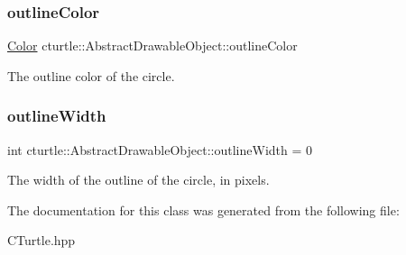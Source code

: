 \subsubsection{\texorpdfstring{outline\+Color}{outlineColor}}
{\footnotesize\ttfamily \hyperlink{classcturtle_1_1Color}{Color} cturtle\+::\+Abstract\+Drawable\+Object\+::outline\+Color}

The outline color of the circle. \mbox{\label{classcturtle_1_1AbstractDrawableObject_aeffaecc245057e9a42e5688671a77f52}} 
\subsubsection{\texorpdfstring{outline\+Width}{outlineWidth}}
{\footnotesize\ttfamily int cturtle\+::\+Abstract\+Drawable\+Object\+::outline\+Width = 0}

The width of the outline of the circle, in pixels. 

The documentation for this class was generated from the following file\+:\begin{DoxyCompactItemize}
\item 
C\+Turtle.\+hpp\end{DoxyCompactItemize}
